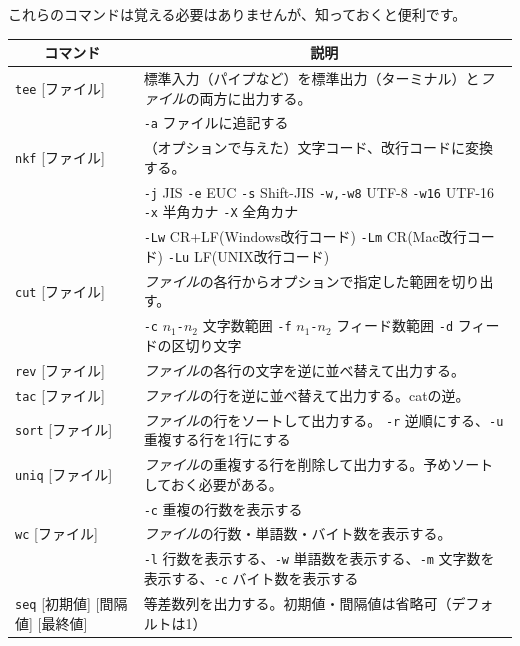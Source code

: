 \documentclass[a4j]{ltjsreport}
\begin{document}
    これらのコマンドは覚える必要はありませんが、知っておくと便利です。
    \begin{longtable}[c]{|p{3.5cm}|p{13.5cm}|}
        \hline
        \multicolumn{1}{|c|}{\textbf{コマンド}}&\multicolumn{1}{|c|}{\textbf{説明}}\\
        \hline\hline
        \texttt{tee} [ファイル] &標準入力（パイプなど）を標準出力（ターミナル）と\emph{ファイル}の両方に出力する。\\
        & \texttt{-a} ファイルに追記する\\
        \hline
        \texttt{nkf} [ファイル] &（オプションで与えた）文字コード、改行コードに変換する。\\
        &\texttt{-j} JIS \texttt{-e} EUC \texttt{-s} Shift-JIS \texttt{-w,-w8} UTF-8 \texttt{-w16} UTF-16 \texttt{-x} 半角カナ \texttt{-X} 全角カナ\\
        &\texttt{-Lw} CR+LF(Windows改行コード) \texttt{-Lm} CR(Mac改行コード) \texttt{-Lu} LF(UNIX改行コード)\\
        \hline
        \texttt{cut} [ファイル]&\emph{ファイル}の各行からオプションで指定した範囲を切り出す。\\
        &\texttt{-c} \textit{$n_1$\texttt{-}$n_2$} 文字数範囲 \texttt{-f} \textit{$n_1$\texttt{-}$n_2$} フィード数範囲 \texttt{-d} フィードの区切り文字 \\
        \hline
        \texttt{rev} [ファイル]&\emph{ファイル}の各行の文字を逆に並べ替えて出力する。\\
        \hline
        \texttt{tac} [ファイル]&\emph{ファイル}の行を逆に並べ替えて出力する。catの逆。\\
        \hline
        \texttt{sort} [ファイル]&\emph{ファイル}の行をソートして出力する。 \texttt{-r} 逆順にする、\texttt{-u} 重複する行を1行にする\\ 
        \hline
        \texttt{uniq} [ファイル]&\emph{ファイル}の重複する行を削除して出力する。予めソートしておく必要がある。\\
        &\texttt{-c} 重複の行数を表示する\\
        \hline
        \texttt{wc} [ファイル]&\emph{ファイル}の行数・単語数・バイト数を表示する。\\
        &\texttt{-l} 行数を表示する、\texttt{-w} 単語数を表示する、\texttt{-m} 文字数を表示する、\texttt{-c} バイト数を表示する\\
        \hline
        \texttt{seq} [初期値] [間隔値] [最終値] &等差数列を出力する。初期値・間隔値は省略可（デフォルトは1）\\

\end{longtable}
\end{document}
